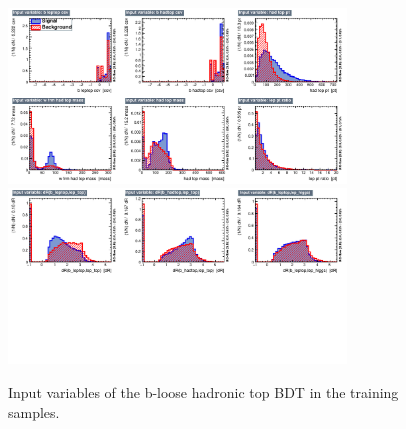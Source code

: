 
\begin{figure}[hbtp]
 \begin{center}
   \includegraphics[width=0.8\textwidth]{ch8_figs/recoBdt_bloose/variables_id_c1.pdf}
   \includegraphics[width=0.8\textwidth]{ch8_figs/recoBdt_bloose/variables_id_c2.pdf}
   \caption[Input variables of the b-loose hadronic top BDT]{Input variables of the b-loose hadronic top BDT in the training samples.}
   \label{fig:recoBdt_bloose_inputs}
 \end{center}
\end{figure}

